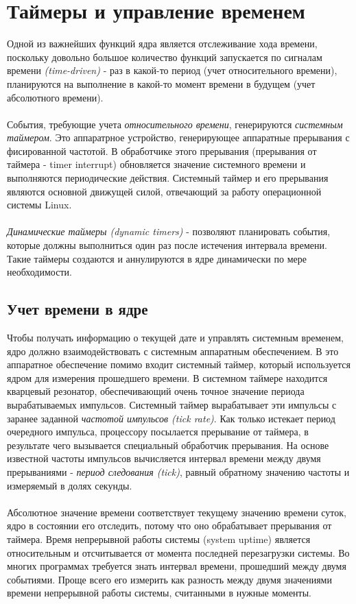 \section{Таймеры и управление временем}
    Одной из важнейших функций ядра является отслеживание хода времени, поскольку довольно большое количество функций запускается по сигналам времени \textit{(time-driven)} - раз в какой-то период (учет относительного времени), планируются на выполнение в какой-то момент времени в будущем (учет абсолютного времени).
    \\\\
    События, требующие учета \textit{относительного времени}, генерируются \textit{системным таймером}. Это аппаратрное устройство, генерирующее аппаратные прерывания с фисированной частотой. В обработчике этого прерывания (прерывания от таймера - timer interrupt) обновляется значение системного времени и выполняются периодические действия. Системный таймер и его прерывания являются основной движущей силой, отвечающий за работу операционной системы Linux.
    \\\\
    \textit{Динамические таймеры (dynamic timers)} - позволяют планировать события, которые должны выполниться один раз после истечения интервала времени. Такие таймеры создаются и аннулируются в ядре динамически по мере необходимости.
    
    \subsection{Учет времени в ядре}
    Чтобы получать информацию о текущей дате и управлять системным временем, ядро должно взаимодействовать с системным аппаратным обеспечением. В это аппаратное обеспечение помимо входит системный таймер, который используется ядром для измерения прошедшего времени. В системном таймере находится кварцевый резонатор, обеспечивающий очень точное значение периода вырабатываемых импульсов. Системный таймер вырабатывает эти импульсы с заранее заданной \textit{частотой импульсов (tick rate)}. Как только истекает период очередного импульса, процессору посылается прерывание от таймера, в результате чего вызывается специальный обработчик прерывания. На основе известной частоты импульсов вычисляется интервал времени между двумя прерываниями - \textit{период следования (tick)}, равный обратному значению частоты и измеряемый в долях секунды.
    \\\\
    Абсолютное значение времени соответствует текущему значению времени суток, ядро в состоянии его отследить, потому что оно обрабатывает прерывания от таймера. Время непрерывной работы системы (system uptime) является относительным и отсчитывается от момента последней перезагрузки системы. Во многих программах требуется знать интервал времени, прошедший между двумя событиями. Проще всего его измерить как разность между двумя значениями времени непрерывной работы системы, считанными в нужные моменты.
    
